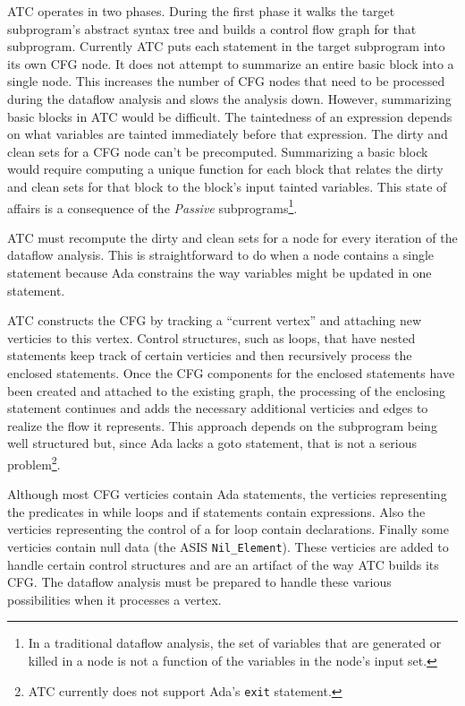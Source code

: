 \documentclass{article}
\begin{document}
ATC operates in two phases. During the first phase it walks the target subprogram's abstract syntax tree and builds a control flow graph for that subprogram. Currently ATC puts each statement in the target subprogram into its own CFG node. It does not attempt to summarize an entire basic block into a single node. This increases the number of CFG nodes that need to be processed during the dataflow analysis and slows the analysis down. However, summarizing basic blocks in ATC would be difficult. The taintedness of an expression depends on what variables are tainted immediately before that expression. The dirty and clean sets for a CFG node can't be precomputed. Summarizing a basic block would require computing a unique function for each block that relates the dirty and clean sets for that block to the block's input tainted variables. This state of affairs is a consequence of the \textit{Passive} subprograms\footnote{In a traditional dataflow analysis, the set of variables that are generated or killed in a node is not a function of the variables in the node's input set.}.

ATC must recompute the dirty and clean sets for a node for every iteration of the dataflow analysis. This is straightforward to do when a node contains a single statement because Ada constrains the way variables might be updated in one statement.

ATC constructs the CFG by tracking a ``current vertex'' and attaching new verticies to this vertex. Control structures, such as loops, that have nested statements keep track of certain verticies and then recursively process the enclosed statements. Once the CFG components for the enclosed statements have been created and attached to the existing graph, the processing of the enclosing statement continues and adds the necessary additional verticies and edges to realize the flow it represents. This approach depends on the subprogram being well structured but, since Ada lacks a goto statement, that is not a serious problem\footnote{ATC currently does not support Ada's \texttt{exit} statement.}.

Although most CFG verticies contain Ada statements, the verticies representing the predicates in while loops and if statements contain expressions. Also the verticies representing the control of a for loop contain declarations. Finally some verticies contain null data (the ASIS \texttt{Nil\_Element}). These verticies are added to handle certain control structures and are an artifact of the way ATC builds its CFG. The dataflow analysis must be prepared to handle these various possibilities when it processes a vertex.
\end{document}
